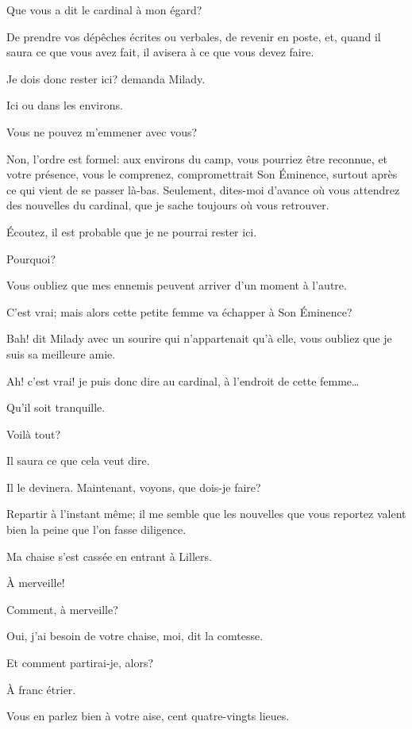 \speak  Que vous a dit le cardinal à mon égard? 

\speak  De prendre vos dépêches écrites ou verbales, de revenir en poste, et, quand il saura ce que vous avez fait, il avisera à ce que vous devez faire. 

\speak  Je dois donc rester ici? demanda Milady. 

\speak  Ici ou dans les environs. 

\speak  Vous ne pouvez m'emmener avec vous? 

\speak  Non, l'ordre est formel: aux environs du camp, vous pourriez être reconnue, et votre présence, vous le comprenez, compromettrait Son Éminence, surtout après ce qui vient de se passer là-bas. Seulement, dites-moi d'avance où vous attendrez des nouvelles du cardinal, que je sache toujours où vous retrouver. 

\speak  Écoutez, il est probable que je ne pourrai rester ici. 

\speak  Pourquoi? 

\speak  Vous oubliez que mes ennemis peuvent arriver d'un moment à l'autre. 

\speak  C'est vrai; mais alors cette petite femme va échapper à Son Éminence? 

\speak  Bah! dit Milady avec un sourire qui n'appartenait qu'à elle, vous oubliez que je suis sa meilleure amie. 

\speak  Ah! c'est vrai! je puis donc dire au cardinal, à l'endroit de cette femme\dots 

\speak  Qu'il soit tranquille. 

\speak  Voilà tout? 

\speak  Il saura ce que cela veut dire. 

\speak  Il le devinera. Maintenant, voyons, que dois-je faire? 

\speak  Repartir à l'instant même; il me semble que les nouvelles que vous reportez valent bien la peine que l'on fasse diligence. 

\speak  Ma chaise s'est cassée en entrant à Lillers. 

\speak  À merveille! 

\speak  Comment, à merveille? 

\speak  Oui, j'ai besoin de votre chaise, moi, dit la comtesse. 

\speak  Et comment partirai-je, alors? 

\speak  À franc étrier. 

\speak  Vous en parlez bien à votre aise, cent quatre-vingts lieues. 


